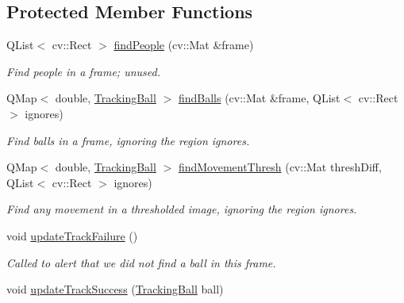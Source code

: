 \subsection*{Protected Member Functions}
\begin{DoxyCompactItemize}
\item 
Q\+List$<$ cv\+::\+Rect $>$ \hyperlink{classKFBallTracker_a32cdf9c7048a549db1cd43ca112c7301}{find\+People} (cv\+::\+Mat \&frame)
\begin{DoxyCompactList}\small\item\em Find people in a frame; unused. \end{DoxyCompactList}\item 
Q\+Map$<$ double, \hyperlink{classTrackingBall}{Tracking\+Ball} $>$ \hyperlink{classKFBallTracker_ac252f0f096afd969a5632038bc5c57ca}{find\+Balls} (cv\+::\+Mat \&frame, Q\+List$<$ cv\+::\+Rect $>$ ignores)\hypertarget{classKFBallTracker_ac252f0f096afd969a5632038bc5c57ca}{}\label{classKFBallTracker_ac252f0f096afd969a5632038bc5c57ca}

\begin{DoxyCompactList}\small\item\em Find balls in a frame, ignoring the region ignores. \end{DoxyCompactList}\item 
Q\+Map$<$ double, \hyperlink{classTrackingBall}{Tracking\+Ball} $>$ \hyperlink{classKFBallTracker_a66ed39eb604f97965c6ea6b674c11e31}{find\+Movement\+Thresh} (cv\+::\+Mat thresh\+Diff, Q\+List$<$ cv\+::\+Rect $>$ ignores)\hypertarget{classKFBallTracker_a66ed39eb604f97965c6ea6b674c11e31}{}\label{classKFBallTracker_a66ed39eb604f97965c6ea6b674c11e31}

\begin{DoxyCompactList}\small\item\em Find any movement in a thresholded image, ignoring the region ignores. \end{DoxyCompactList}\item 
void \hyperlink{classKFBallTracker_ae9377353e8bee1d6384dcc41711c1fb5}{update\+Track\+Failure} ()\hypertarget{classKFBallTracker_ae9377353e8bee1d6384dcc41711c1fb5}{}\label{classKFBallTracker_ae9377353e8bee1d6384dcc41711c1fb5}

\begin{DoxyCompactList}\small\item\em Called to alert that we did not find a ball in this frame. \end{DoxyCompactList}\item 
void \hyperlink{classKFBallTracker_a2a393926da9750572cc0c401f551e991}{update\+Track\+Success} (\hyperlink{classTrackingBall}{Tracking\+Ball} ball)\hypertarget{classKFBallTracker_a2a393926da9750572cc0c401f551e991}{}\label{classKFBallTracker_a2a393926da9750572cc0c401f551e991}


\end{DoxyCompactItemize}
